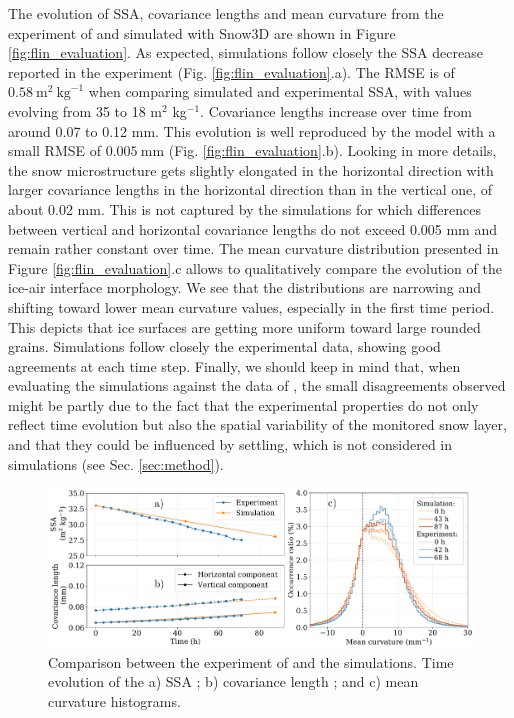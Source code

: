 \documentclass[draft,ms]{agujournal2019}
\begin{document}
The evolution of SSA, covariance lengths and mean curvature from the experiment of  and simulated with Snow3D are shown in Figure \ref{fig:flin_evaluation}. As expected, simulations follow closely the SSA decrease reported in the experiment (Fig. \ref{fig:flin_evaluation}.a).
The RMSE is of $0.58\ \mathrm{m}^2\ \mathrm{kg}^{-1}$ when comparing simulated and experimental SSA, with values evolving from 35 to 18 m$^2$ kg$^{-1}$.
Covariance lengths increase over time from around 0.07 to 0.12 mm. This evolution is well reproduced by the model with a small RMSE of $0.005\ \mathrm{mm}$ (Fig. \ref{fig:flin_evaluation}.b). Looking in more details, the snow microstructure gets slightly elongated in the horizontal direction with larger covariance lengths in the horizontal direction than in the vertical one, of about 0.02 mm. This is not captured by the simulations for which differences between vertical and horizontal covariance lengths do not exceed 0.005 mm and remain rather constant over time. 
The mean curvature distribution presented in Figure \ref{fig:flin_evaluation}.c allows to qualitatively compare the evolution of the ice-air interface morphology. We see that the distributions are narrowing and shifting toward lower mean curvature values, especially in the first time period. This depicts that ice surfaces are getting more uniform toward large rounded grains. Simulations follow closely the experimental data, showing good agreements at each time step. Finally, we should keep in mind that, when evaluating the simulations against the data of , the small disagreements observed might be partly due to the fact that the experimental properties do not only reflect time evolution but also the spatial variability of the monitored snow layer, and that they could be influenced by settling, which is not considered in simulations (see Sec. \ref{sec:method}).\\

\begin{figure}
    \centering
    \includegraphics[width=\linewidth]{Figures/microstruct_EBONI_exp_simu.pdf}
    \caption{Comparison between the experiment of \protect{} and the simulations. Time evolution of the a) SSA ; b) covariance length ; and c) mean curvature histograms.}
    \label{fig:eboni}
\end{figure}
\end{document}
